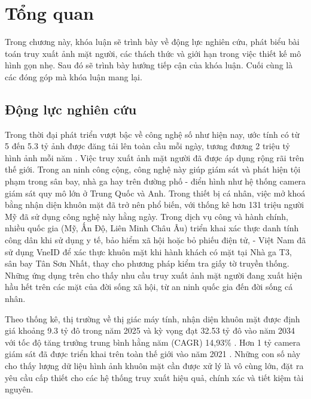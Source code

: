 \chapter{Tổng quan}
\label{Chapter1}

Trong chương này, khóa luận sẽ trình bày về động lực nghiên cứu, phát biểu bài toán truy xuất ảnh mặt người, các thách thức và giới hạn trong việc thiết kế mô hình gọn nhẹ. Sau đó sẽ trình bày hướng tiếp cận của khóa luận. Cuối cùng là các đóng góp mà khóa luận mang lại.
\section{Động lực nghiên cứu}
Trong thời đại phát triển vượt bậc về công nghệ số như hiện nay, ước tính có từ 5 đến 5.3 tỷ ảnh được đăng tải lên toàn cầu mỗi ngày, tương đương 2 triệu tỷ hình ảnh mỗi năm \cite{omnicore2025instagram}. Việc truy xuất ảnh mặt người đã được áp dụng rộng rãi trên thế giới. Trong an ninh công cộng, công nghệ này giúp giám sát và phát hiện tội phạm trong sân bay, nhà ga hay trên đường phố - điển hình như hệ thống camera giám sát quy mô lớn ở Trung Quốc và Anh. Trong thiết bị cá nhân, việc mở khoá bằng nhận diện khuôn mặt đã trở nên phổ biến, với thống kê hơn 131 triệu người Mỹ đã sử dụng công nghệ này hằng ngày. Trong dịch vụ công và hành chính, nhiều quốc gia (Mỹ, Ấn Độ, Liên Minh Châu Âu) triển khai xác thực danh tính công dân khi sử dụng y tế, bảo hiểm xã hội hoặc bỏ phiếu điện tử, - Việt Nam đã sử dụng VneID để xác thực khuôn mặt khi hành khách có mặt tại Nhà ga T3, sân bay Tân Sơn Nhất, thay cho phương pháp kiểm tra giấy tờ truyền thống. 
Những ứng dụng trên cho thấy nhu cầu truy xuất ảnh mặt người đang xuất hiện hầu hết trên các mặt của đời sống xã hội, từ an ninh quốc gia đến đời sống cá nhân.

Theo thống kê, thị trường về thị giác máy tính, nhận diện khuôn mặt được định giá khoảng 9.3 tỷ đô trong năm 2025 và kỳ vọng đạt 32.53 tỷ đô vào năm 2034 với tốc độ tăng trưởng trung bình hằng năm (CAGR) 14,93\% \cite{face-recognition-market}. Hơn 1 tỷ camera giám sát đã được triển khai trên toàn thế giới vào năm 2021 \cite{cnbc2019cameras}. Những con số này cho thấy lượng dữ liệu hình ảnh khuôn mặt cần được xử lý là vô cùng lớn, đặt ra yêu cầu cấp thiết cho các hệ thống truy xuất hiệu quả, chính xác và tiết kiệm tài nguyên.


